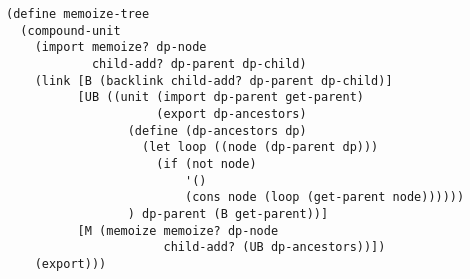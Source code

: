 \documentclass[landscape]{slides}
\begin{document}
\begin{slide}
\small
\begin{verbatim}
(define memoize-tree
  (compound-unit
    (import memoize? dp-node
            child-add? dp-parent dp-child)
    (link [B (backlink child-add? dp-parent dp-child)]
          [UB ((unit (import dp-parent get-parent)
                     (export dp-ancestors)
                 (define (dp-ancestors dp)
                   (let loop ((node (dp-parent dp)))
                     (if (not node)
                         '()
                         (cons node (loop (get-parent node))))))
                 ) dp-parent (B get-parent))]
          [M (memoize memoize? dp-node
                      child-add? (UB dp-ancestors))])
    (export)))
\end{verbatim}
\end{slide}
\end{document}
